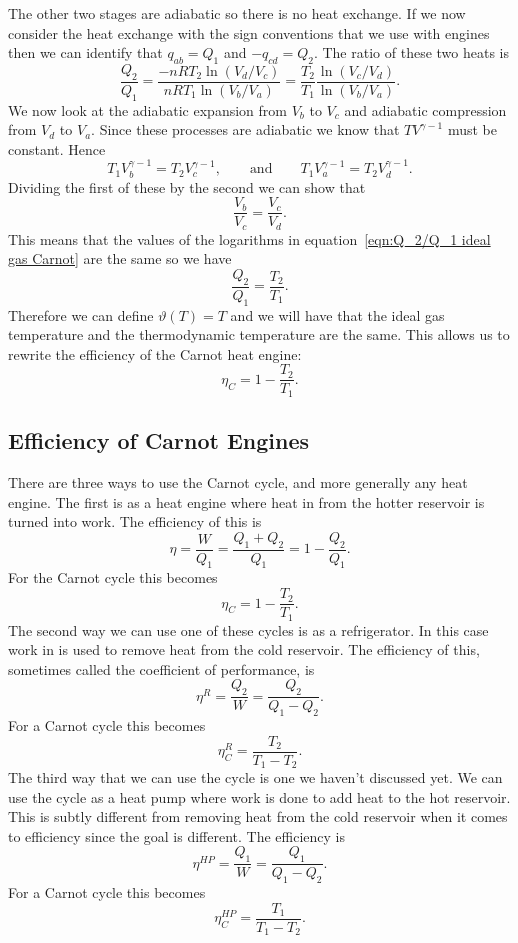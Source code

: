     The other two stages are adiabatic so there is no heat exchange.
    If we now consider the heat exchange with the sign conventions that we use with engines then we can identify that \(q_{ab} = Q_1\) and \(-q_{cd} = Q_2\).
    The ratio of these two heats is
    \begin{equation}\label{eqn:Q_2/Q_1 ideal gas Carnot}
        \frac{Q_2}{Q_1} = \frac{-nRT_2\ln(V_d/V_c)}{nRT_1\ln(V_b/V_a)} = \frac{T_2}{T_1}\frac{\ln(V_c/V_d)}{\ln(V_b/V_a)}.
    \end{equation}
    We now look at the adiabatic expansion from \(V_b\) to \(V_c\) and adiabatic compression from \(V_d\) to \(V_a\).
    Since these processes are adiabatic we know that \(TV^{\gamma - 1}\) must be constant.
    Hence
    \[T_1V_b^{\gamma-1} = T_2V_c^{\gamma-1}, \qquad\text{and}\qquad T_1V_a^{\gamma-1} = T_2V_d^{\gamma-1}.\]
    Dividing the first of these by the second we can show that
    \[\frac{V_b}{V_c} = \frac{V_c}{V_d}.\]
    This means that the values of the logarithms in equation~\ref{eqn:Q_2/Q_1 ideal gas Carnot} are the same so we have
    \[\frac{Q_2}{Q_1} = \frac{T_2}{T_1}.\]
    Therefore we can define \(\vartheta(T) = T\) and we will have that the ideal gas temperature and the thermodynamic temperature are the same.
    This allows us to rewrite the efficiency of the Carnot heat engine:
    \[\eta_C = 1 - \frac{T_2}{T_1}.\]
    
    \subsection{Efficiency of Carnot Engines}
    There are three ways to use the Carnot cycle, and more generally any heat engine.
    The first is as a heat engine where heat in from the hotter reservoir is turned into work.
    The efficiency of this is
    \[\eta = \frac{W}{Q_1} = \frac{Q_1 + Q_2}{Q_1} = 1 - \frac{Q_2}{Q_1}.\]
    For the Carnot cycle this becomes
    \[\eta_C = 1 - \frac{T_2}{T_1}.\]
    The second way we can use one of these cycles is as a refrigerator.
    In this case work in is used to remove heat from the cold reservoir.
    The efficiency of this, sometimes called the coefficient of performance, is
    \[\eta^R = \frac{Q_2}{W} = \frac{Q_2}{Q_1 - Q_2}.\]
    For a Carnot cycle this becomes
    \[\eta_C^R = \frac{T_2}{T_1 - T_2}.\]
    The third way that we can use the cycle is one we haven't discussed yet.
    We can use the cycle as a heat pump where work is done to add heat to the hot reservoir.
    This is subtly different from removing heat from the cold reservoir when it comes to efficiency since the goal is different.
    The efficiency is
    \[\eta^{HP} = \frac{Q_1}{W} = \frac{Q_1}{Q_1 - Q_2}.\]
    For a Carnot cycle this becomes
    \[\eta_C^{HP} = \frac{T_1}{T_1 - T_2}.\]
    
